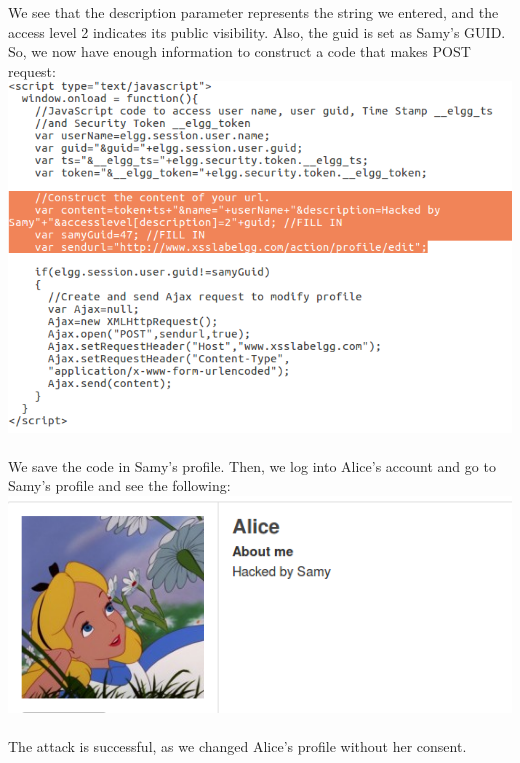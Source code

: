 \documentclass[a4paper]{article}
\begin{document}
We see that the description parameter represents the string we entered, and the access level 2 indicates its public visibility. Also, the guid is set as Samy's GUID. So, we now have enough information to construct a code that makes POST request:\\
\includegraphics[scale=0.7]{2/21.png}\\\\
We save the code in Samy's profile. Then, we log into Alice's account and go to Samy's profile and see the following:\\
\includegraphics[scale=0.7]{2/22.png}\\\\
The attack is successful, as we changed Alice's profile without her consent.\\
\end{document}
